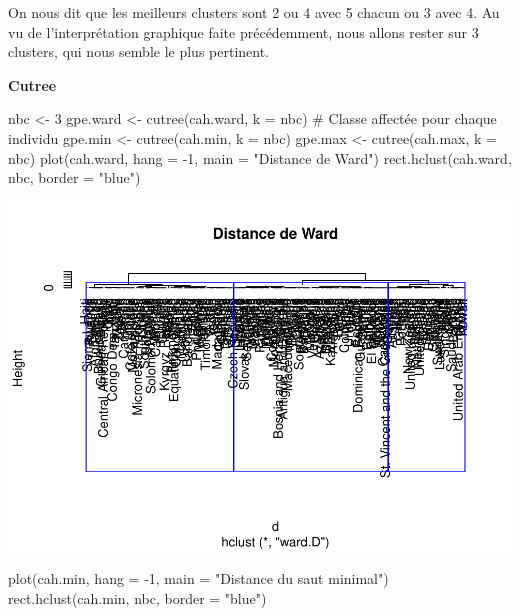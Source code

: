 \documentclass[
]{article}
\newenvironment{Shaded}{}{}
\newcommand{\AttributeTok}[1]{#1}
\newcommand{\CommentTok}[1]{\textcolor[rgb]{0.00,0.50,0.00}{#1}}
\newcommand{\DecValTok}[1]{#1}
\newcommand{\FunctionTok}[1]{#1}
\newcommand{\NormalTok}[1]{#1}
\newcommand{\OtherTok}[1]{\textcolor[rgb]{1.00,0.25,0.00}{#1}}
\newcommand{\SpecialCharTok}[1]{\textcolor[rgb]{0.00,0.50,0.50}{#1}}
\newcommand{\StringTok}[1]{\textcolor[rgb]{0.00,0.50,0.50}{#1}}
\begin{document}
On nous dit que les meilleurs clusters sont 2 ou 4 avec 5 chacun ou 3
avec 4. Au vu de l'interprétation graphique faite précédemment, nous
allons rester sur 3 clusters, qui nous semble le plus pertinent.

\textbf{Cutree}

\begin{Shaded}
\begin{Highlighting}[]
\NormalTok{nbc }\OtherTok{\textless{}{-}} \DecValTok{3}
\NormalTok{gpe.ward }\OtherTok{\textless{}{-}} \FunctionTok{cutree}\NormalTok{(cah.ward, }\AttributeTok{k =}\NormalTok{ nbc) }\CommentTok{\# Classe affectée pour chaque individu}
\NormalTok{gpe.min }\OtherTok{\textless{}{-}} \FunctionTok{cutree}\NormalTok{(cah.min, }\AttributeTok{k =}\NormalTok{ nbc)}
\NormalTok{gpe.max }\OtherTok{\textless{}{-}} \FunctionTok{cutree}\NormalTok{(cah.max, }\AttributeTok{k =}\NormalTok{ nbc)}
\FunctionTok{plot}\NormalTok{(cah.ward, }\AttributeTok{hang =} \SpecialCharTok{{-}}\DecValTok{1}\NormalTok{, }\AttributeTok{main =} \StringTok{"Distance de Ward"}\NormalTok{)}
\FunctionTok{rect.hclust}\NormalTok{(cah.ward, nbc, }\AttributeTok{border =} \StringTok{"blue"}\NormalTok{)}
\end{Highlighting}
\end{Shaded}

\includegraphics{Projet_files/figure-latex/unnamed-chunk-19-1.pdf}

\begin{Shaded}
\begin{Highlighting}[]
\FunctionTok{plot}\NormalTok{(cah.min, }\AttributeTok{hang =} \SpecialCharTok{{-}}\DecValTok{1}\NormalTok{, }\AttributeTok{main =} \StringTok{"Distance du saut minimal"}\NormalTok{)}
\FunctionTok{rect.hclust}\NormalTok{(cah.min, nbc, }\AttributeTok{border =} \StringTok{"blue"}\NormalTok{)}
\end{Highlighting}
\end{Shaded}
\end{document}
